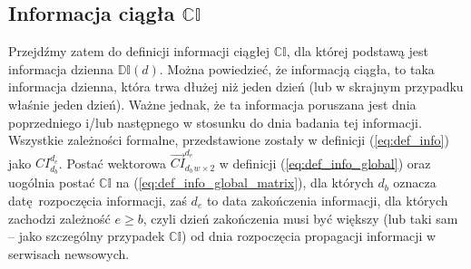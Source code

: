 \subsection{Informacja ciągła $\mathbb{CI}$}

Przejdźmy zatem do definicji  informacji ciągłej $\mathbb{CI}$, dla której podstawą jest 
informacja dzienna $\mathbb{DI}(d)$. Można powiedzieć, że informacją ciągła, to taka informacja 
dzienna, która trwa dłużej niż jeden dzień (lub w skrajnym przypadku właśnie jeden dzień). 
Ważne jednak, że ta informacja poruszana jest dnia poprzedniego i/lub następnego w stosunku 
do dnia badania tej informacji. Wszystkie zależności formalne, przedstawione zostały 
w definicji (\ref{eq:def_info}) jako $CI_{d_{b}}^{d_{e}}$. Postać wektorowa 
$\vec{CI}_{d_{b}}^{d_{e}}_{w \times 2}$ w definicji (\ref{eq:def_info_global}) 
oraz uogólnia postać $\mathbb{CI}$ na (\ref{eq:def_info_global_matrix}), dla których 
$d_{b}$ oznacza datę rozpoczęcia informacji, zaś $d_{e}$ to data zakończenia informacji,
dla których zachodzi zależność $e \geq b$, czyli dzień zakończenia musi być większy 
(lub taki sam -- jako szczególny przypadek $\mathbb{CI}$) od dnia rozpoczęcia propagacji
informacji w serwisach newsowych.

